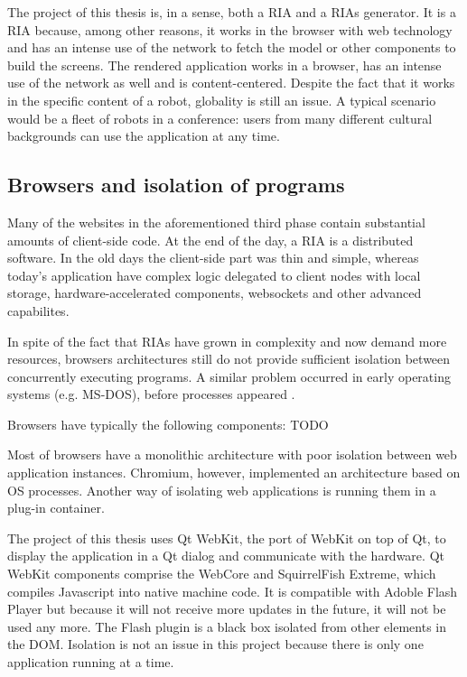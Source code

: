 The project of this thesis is, in a sense, both a \ac{RIA} and a \acp{RIA} generator. 
It is a \ac{RIA} because, among other reasons, it works in the browser with web technology and has an intense use of the network to fetch the model or other components to build the screens.
The rendered application works in a browser, has an intense use of the network as well and is content-centered.
Despite the fact that it works in the specific content of a robot, globality is still an issue. A typical scenario would be a fleet of robots in a conference: users from many different cultural backgrounds can use the application at any time.




\subsection{Browsers and isolation of programs}    
Many of the websites in the aforementioned third phase contain substantial amounts of client-side code. At the end of the day, a \ac{RIA} is a distributed software. 
In the old days the client-side part was thin and simple, whereas today's application have complex logic delegated to client nodes with local storage, hardware-accelerated components, websockets and other advanced capabilites.

In spite of the fact that \acp{RIA} have grown in complexity and now demand more resources, browsers architectures still do not provide sufficient isolation between concurrently executing programs.
A similar problem occurred in early operating systems (e.g. MS-DOS), before processes appeared \cite{Reis:2009}. 

Browsers have typically the following components: TODO

Most of browsers have a monolithic architecture with poor isolation between web application instances. Chromium, however, implemented an architecture based on OS processes. 
Another way of isolating web applications is running them in a plug-in container. 

The project of this thesis uses Qt WebKit, the port of WebKit on top of Qt, to display the application in a Qt dialog and communicate with the hardware. 
Qt WebKit components comprise the WebCore and SquirrelFish Extreme, which compiles Javascript into native machine code. 
It is compatible with Adoble Flash Player but because it will not receive more updates in the future, it will not be used any more.
The Flash plugin is a black box isolated from other elements in the \ac{DOM}.
Isolation is not an issue in this project because there is only one application running at a time.

